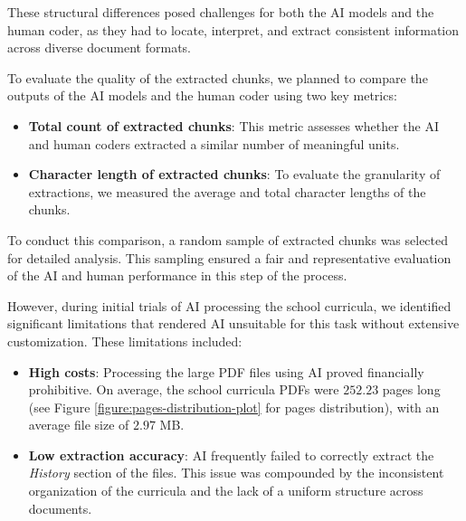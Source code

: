 \documentclass[]{interact}
\theoremstyle{plain}%
\theoremstyle{definition}
\theoremstyle{remark}
\begin{document}
These structural differences posed challenges for both the AI models and the human coder, as they had to locate, interpret, and extract consistent information across diverse document formats.  

To evaluate the quality of the extracted chunks, we planned to compare the outputs of the AI models and the human coder using two key metrics:  
\begin{itemize}
    \item \textbf{Total count of extracted chunks}: This metric assesses whether the AI and human coders extracted a similar number of meaningful units.
    \item \textbf{Character length of extracted chunks}: To evaluate the granularity of extractions, we measured the average and total character lengths of the chunks.
\end{itemize}

To conduct this comparison, a random sample of extracted chunks was selected for detailed analysis. This sampling ensured a fair and representative evaluation of the AI and human performance in this step of the process.

However, during initial trials of AI processing the school curricula, we identified significant limitations that rendered AI unsuitable for this task without extensive customization. These limitations included:  
\begin{itemize}
    \item \textbf{High costs}: Processing the large PDF files using AI proved financially prohibitive. On average, the school curricula PDFs were $252.23$ pages long (see Figure \ref{figure:pages-distribution-plot} for pages distribution), with an average file size of $2.97$ MB.  
    \item \textbf{Low extraction accuracy}: AI frequently failed to correctly extract the \textit{History} section of the files. This issue was compounded by the inconsistent organization of the curricula and the lack of a uniform structure across documents.  
\end{itemize}
\end{document}
